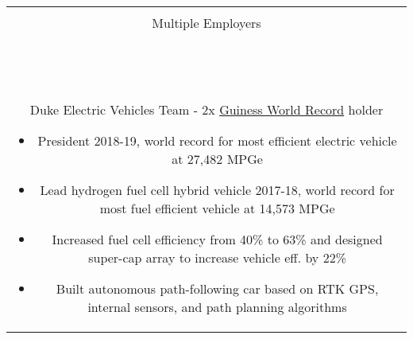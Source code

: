 \documentclass[11pt]{amsart}
\newcommand*\ruleline[1]{\par\noindent\raisebox{.8ex}{\makebox[\linewidth]{\hrulefill\hspace{1ex}\raisebox{-.8ex}{\Large~#1~}\hspace{1ex}\hrulefill}}\\ \-\ \vspace{-1em}}
\begin{document}
\begin{center}
\begin{tabular}{c}
\begin{minipage}{\textwidth}
		{\bf Tutor} \hfill {\bf 05/2014 to 05/2019}\\
		Multiple Employers
	\end{minipage}\\~\\
	\ruleline{Activities}
	\begin{minipage}{\textwidth}
		{\bf Co-President} \hfill {\bf 08/2015 to 07/2019}\\
		{Duke Electric Vehicles Team - 2x \href{http://www.guinnessworldrecords.com/world-records/most-fuel-efficient-vehicle}{Guiness World Record} holder}
		\begin{itemize}
			\item President 2018-19, world record for most efficient electric vehicle at 27,482 MPGe
			\item Lead hydrogen fuel cell hybrid vehicle 2017-18, world record for most fuel efficient vehicle at 14,573 MPGe
			\item Increased fuel cell efficiency from 40\% to 63\% and designed super-cap array to increase vehicle eff. by 22\%
			\item Built autonomous path-following car based on RTK GPS, internal sensors, and path planning algorithms
		\end{itemize}
	\end{minipage}%
\end{tabular}\end{center}
\end{document}
